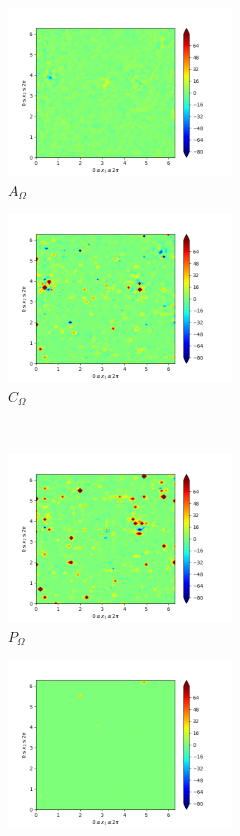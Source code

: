 \begin{figure}[H]
\begin{subfigure}{0.45\textwidth}
        \includegraphics[height=1.75in]{media/run-cds-65/A-enst-1420.png}
        \caption{$A_{\Omega}$}
    \end{subfigure}
    \newline
    \begin{subfigure}{0.45\textwidth}
        \includegraphics[height=1.75in]{media/run-cds-65/Pi-enst-1420.png}
        \caption{$C_{\Omega}$}
    \end{subfigure}
    ~
    \begin{subfigure}{0.45\textwidth}
        \includegraphics[height=1.75in]{media/run-cds-65/P-enst-1420.png}
        \caption{$P_{\Omega}$}
    \end{subfigure}
    \newline
    \begin{subfigure}{0.45\textwidth}
        \includegraphics[height=1.75in]{media/run-cds-65/B-enst-1420.png}

\end{subfigure}
\end{figure}
